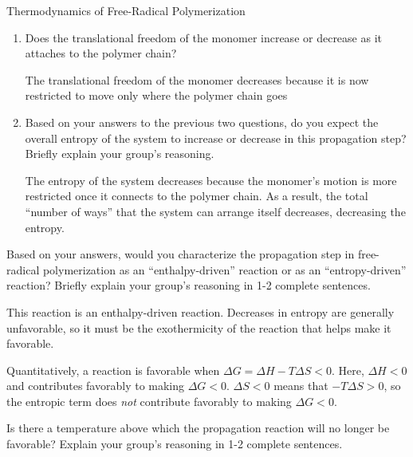\begin{activity}{Thermodynamics of Free-Radical Polymerization}
\begin{ctqs}
\begin{enumerate}
				\begin{solution}[0.5in]
					Decreases by 1 (monomer becomes part of the polymer chain)
				\end{solution}
			
			\item Does the translational freedom of the monomer increase or decrease as it attaches to the polymer chain?
				
				\begin{solution}[0.5in]
					The translational freedom of the monomer decreases because it is now restricted to move only where the polymer chain goes
				\end{solution}
			
			\item Based on your answers to the previous two questions, do you expect the overall entropy of the system to increase or decrease in this propagation step?  Briefly explain your group's reasoning.
				
				\begin{solution}[1.25in]
					The entropy of the system decreases because the monomer's motion is more restricted once it connects to the polymer chain.  As a result, the total ``number of ways'' that the system can arrange itself decreases, decreasing the entropy.
				\end{solution}
			
		\end{enumerate}
	
	\question Based on your answers, would you characterize the propagation step in free-radical polymerization as an ``enthalpy-driven'' reaction or as an ``entropy-driven'' reaction?  Briefly explain your group's reasoning in 1-2 complete sentences.
	
		\begin{solution}[1.25in]
			This reaction is an enthalpy-driven reaction.  Decreases in entropy are generally unfavorable, so it must be the exothermicity of the reaction that helps make it favorable.
			
			Quantitatively, a reaction is favorable when $\Delta G = \Delta H - T\Delta S < 0$.  Here, $\Delta H < 0$ and contributes favorably to making $\Delta G < 0$.  $\Delta S < 0$ means that $-T \Delta S > 0$, so the entropic term does \emph{not} contribute favorably to making $\Delta G < 0$.
		\end{solution}
		
	\question Is there a temperature above which the propagation reaction will no longer be favorable?  Explain your group's reasoning in 1-2 complete sentences.\label{\labelbase:ctq:ceilingconcept}
	

\end{ctqs}
\end{activity}
